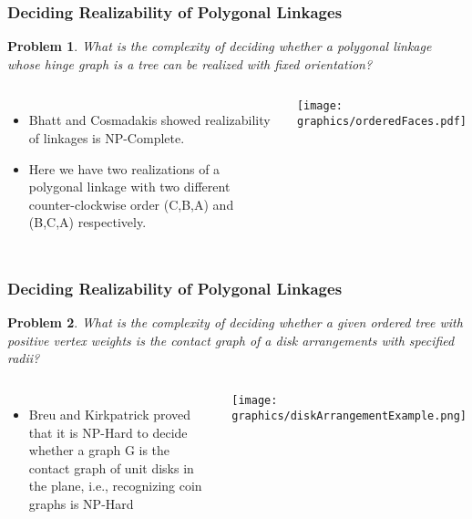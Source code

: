 \documentclass{beamer}
\newtheorem{prob}{Problem}
\begin{document}
\begin{frame}
\frametitle{Deciding Realizability of Polygonal Linkages}
\begin{prob}
What is the complexity of deciding whether a polygonal linkage whose hinge graph is a \textit{tree} can be realized with \textit{fixed orientation}?
\end{prob}
\begin{columns}[c] %
   \begin{itemize}
    \item Bhatt and Cosmadakis showed realizability of linkages is NP-Complete.
    \item Here we have two realizations of a polygonal linkage with two different counter-clockwise order (C,B,A) and (B,C,A) respectively.  
   \end{itemize}
    \begin{minipage}{\linewidth}
        \begin{center}
\texttt{[image: graphics/orderedFaces.pdf]}
\end{center}
    \end{minipage}
  \end{columns}
\end{frame}

\begin{frame}
\frametitle{Deciding Realizability of Polygonal Linkages}
\begin{prob}
What is the complexity of deciding whether a given ordered tree with positive vertex weights is the contact graph of a disk arrangements with specified radii?
\end{prob}
\begin{columns}[c] %
   \begin{itemize}
    \item Breu and Kirkpatrick proved that it is NP-Hard to decide whether a graph G is the contact graph of unit disks in the plane, i.e., recognizing coin graphs is NP-Hard
   \end{itemize}
    \begin{minipage}{\linewidth}
        \begin{center}
        \texttt{[image: graphics/diskArrangementExample.png]}
        \end{center}
    \end{minipage}
  \end{columns}
\end{frame}
\end{document}

